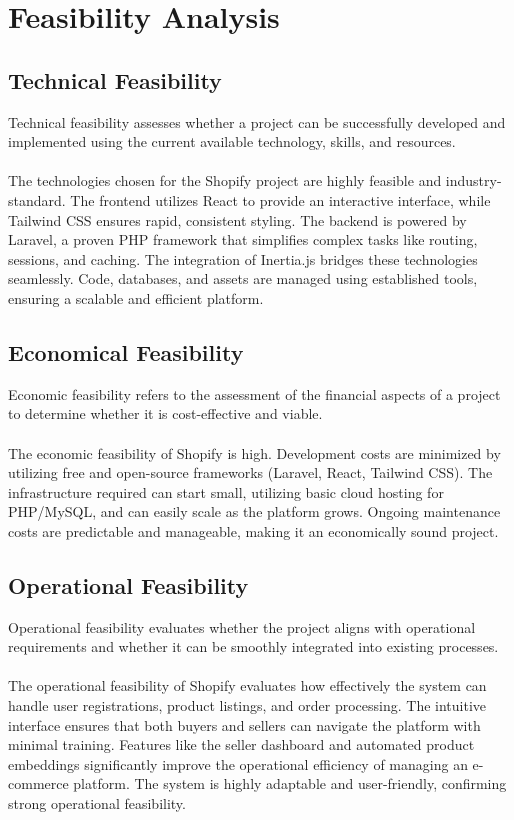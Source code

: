  \section{Feasibility Analysis}
 
 \subsection{Technical Feasibility}
 Technical feasibility assesses whether a project can be successfully developed and implemented using the current available technology, skills, and resources.\\\\
 \noindent
The technologies chosen for the Shopify project are highly feasible and industry-standard. The frontend utilizes React to provide an interactive interface, while Tailwind CSS ensures rapid, consistent styling. The backend is powered by Laravel, a proven PHP framework that simplifies complex tasks like routing, sessions, and caching. The integration of Inertia.js bridges these technologies seamlessly. Code, databases, and assets are managed using established tools, ensuring a scalable and efficient platform.

 \subsection{Economical Feasibility}
 Economic feasibility refers to the assessment of the financial aspects of a project to determine whether it is cost-effective and viable.\\\\
 The economic feasibility of Shopify is high. Development costs are minimized by utilizing free and open-source frameworks (Laravel, React, Tailwind CSS). The infrastructure required can start small, utilizing basic cloud hosting for PHP/MySQL, and can easily scale as the platform grows. Ongoing maintenance costs are predictable and manageable, making it an economically sound project.
 
 \subsection{Operational Feasibility}
 Operational feasibility evaluates whether the project aligns with operational requirements and whether it can be smoothly integrated into existing processes.\\\\
 The operational feasibility of Shopify evaluates how effectively the system can handle user registrations, product listings, and order processing. The intuitive interface ensures that both buyers and sellers can navigate the platform with minimal training. Features like the seller dashboard and automated product embeddings significantly improve the operational efficiency of managing an e-commerce platform. The system is highly adaptable and user-friendly, confirming strong operational feasibility.

